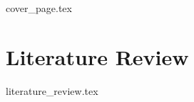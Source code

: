 \documentclass[a4paper, 12pt, oneside]{book}
\begin{document}
\frontmatter
{cover_page.tex}


{  %

\tableofcontents

{\let\clearpage\relax
\listoffigures}
{\let\clearpage\relax
\listoftables}
{\let\clearpage\relax
\printglossary[type=\acronymtype
]}
}

\mainmatter



\chapter{Literature Review}
{literature_review.tex}





\end{document}
